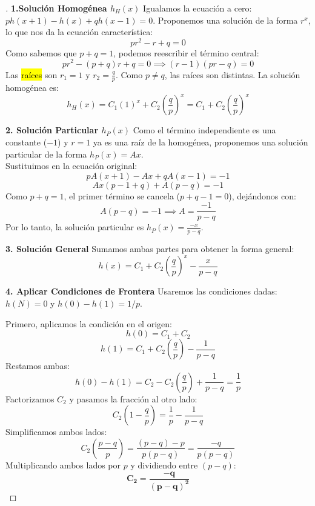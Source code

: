 \documentclass[10pt,a4paper]{article}
\begin{document}
\vspace{2mm}

\begin{proof}[]
    \textbf{1.Solución Homogénea $h_H(x)$}
    Igualamos la ecuación a cero: $p h(x+1) - h(x) + q h(x-1) = 0$.
    Proponemos una solución de la forma $r^x$, lo que nos da la ecuación característica:
    \[ pr^2 - r + q = 0 \]
    Como sabemos que $p + q = 1$, podemos reescribir el término central:
    \[ pr^2 - (p+q)r + q = 0 \implies (r-1)(pr-q) = 0 \]
    Las \hl{raíces} son $r_1 = 1$ y $r_2 = \frac{q}{p}$. Como $p \neq q$, las raíces son distintas. La solución homogénea es:
    \[ h_H(x) = C_1(1)^x + C_2\left(\frac{q}{p}\right)^x = C_1 + C_2\left(\frac{q}{p}\right)^x \]

    \vspace{5mm}

    \textbf{2. Solución Particular $h_P(x)$}
    Como el término independiente es una constante ($-1$) y $r=1$ ya es una raíz de la homogénea, proponemos una solución particular de la forma $h_P(x) = Ax$. \\
    Sustituimos en la ecuación original:
    \[ pA(x+1) - Ax + qA(x-1) = -1 \]
    \[ Ax(p - 1 + q) + A(p - q) = -1 \]
    Como $p + q = 1$, el primer término se cancela ($p+q-1 = 0$), dejándonos con:
    \[ A(p - q) = -1 \implies A = \frac{-1}{p-q} \]
    Por lo tanto, la solución particular es $h_P(x) = \frac{-x}{p-q}$.

    \vspace{5mm}

    \textbf{3. Solución General}
    Sumamos ambas partes para obtener la forma general:
    \[ h(x) = C_1 + C_2\left(\frac{q}{p}\right)^x - \frac{x}{p-q} \]

    \vspace{5mm}

    \textbf{4. Aplicar Condiciones de Frontera}
    Usaremos las condiciones dadas: $h(N) = 0$ y $h(0) - h(1) = 1/p$.

    \vspace{5mm}
    
    Primero, aplicamos la condición en el origen:
    \[ h(0) = C_1 + C_2 \]
    \[ h(1) = C_1 + C_2\left(\frac{q}{p}\right) - \frac{1}{p-q} \]
    Restamos ambas:
    \[ h(0) - h(1) = C_2 - C_2\left(\frac{q}{p}\right) + \frac{1}{p-q} = \frac{1}{p} \]
    Factorizamos $C_2$ y pasamos la fracción al otro lado:
    \[ C_2\left(1 - \frac{q}{p}\right) = \frac{1}{p} - \frac{1}{p-q} \]
    Simplificamos ambos lados:
    \[ C_2\left(\frac{p-q}{p}\right) = \frac{(p-q) - p}{p(p-q)} = \frac{-q}{p(p-q)} \]
    Multiplicando ambos lados por $p$ y dividiendo entre $(p-q)$:
    \[ \mathbf{C_2 = \frac{-q}{(p-q)^2}} \]


\end{proof}
\end{document}
